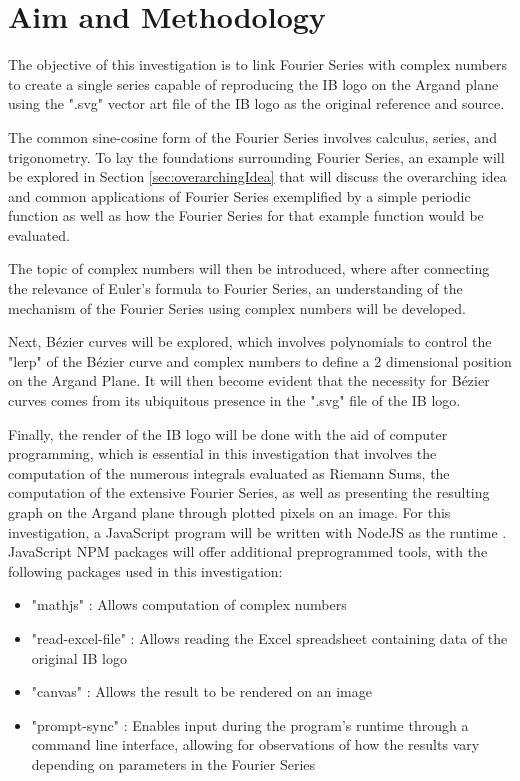 \documentclass[letterpaper, 12pt]{article}
\begin{document}
\section{Aim and Methodology}

The objective of this investigation is to link Fourier Series with
complex numbers to create a single series capable
of reproducing the IB logo on the Argand plane
using the ".svg" vector art file of the IB logo
as the original reference and source.

The common sine-cosine form of the Fourier Series
involves calculus, series, and trigonometry.
To lay the foundations surrounding Fourier Series,
an example will be explored in Section \ref*{sec:overarchingIdea}
that will discuss the overarching idea and common applications of Fourier Series
exemplified by a simple periodic function as well as how
the Fourier Series for that example function would be evaluated.

The topic of complex numbers will then be introduced, where
after connecting the relevance of Euler's formula
to Fourier Series, an understanding of the mechanism of the Fourier Series
using complex numbers will be developed.

Next, Bézier curves will be explored, which involves
polynomials to control the "lerp" of the Bézier curve and
complex numbers to define a 2 dimensional position on the Argand
Plane. It will then become evident that the necessity
for Bézier curves comes from its ubiquitous presence
in the ".svg" file of the IB logo.

Finally, the render of the IB logo will be
done with the aid of computer programming, which is essential in
this investigation that involves the computation of the numerous integrals evaluated as Riemann Sums,
the computation of the extensive Fourier Series,
as well as presenting the resulting graph on the Argand plane
through plotted pixels on an image. For this investigation,
a JavaScript program will be written with NodeJS as the runtime \cite{NodeJs}.
JavaScript NPM packages will offer additional preprogrammed tools,
with the following packages used in this investigation:

\begin{itemize}
    \item "mathjs" \cite{dejongMathjs}: Allows computation of complex numbers
    \item "read-excel-file" \cite{kuchumovReadexcelfile}: Allows reading the Excel spreadsheet containing data of the original IB logo
    \item "canvas" \cite{automatticCanvas}: Allows the result to be rendered on an image
    \item "prompt-sync" \cite{fragomeniPromptsync}: Enables input during the program's runtime through a command line interface, allowing for observations of how the results vary depending on parameters in the Fourier Series
\end{itemize}
\end{document}
